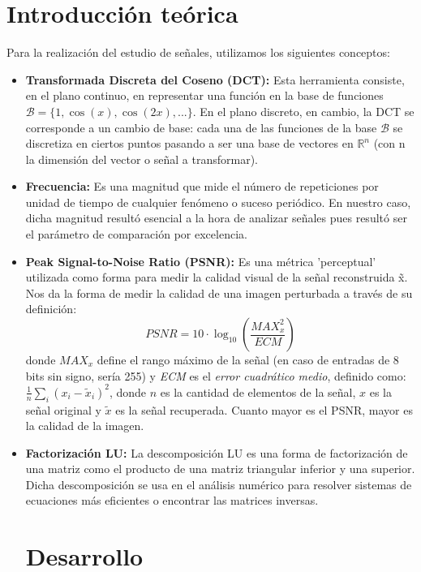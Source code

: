 \documentclass[10pt, a4paper]{article}
\begin{document}
\newpage
\thispagestyle{empty}

\tableofcontents

\newpage

\section{Introducci\'on te\'orica}
Para la realización del estudio de señales, utilizamos los siguientes conceptos:
\begin{itemize}
\item {\textbf{Transformada Discreta del Coseno (DCT):}} Esta herramienta consiste, en el plano continuo, en representar una función en la base de funciones $\mathcal{B}=\{1, \cos(x), \cos(2x),...\}$. En el plano discreto, en cambio, la DCT se corresponde a un cambio de base: cada una de las funciones de la base $\mathcal{B}$ se discretiza en ciertos puntos pasando a ser una base de vectores en $\mathbb{R}^n$ (con n la dimensión del vector o señal a transformar).
\item {\textbf{Frecuencia:}} Es una magnitud que mide el número de repeticiones por unidad de tiempo de cualquier fenómeno o suceso periódico. En nuestro caso, dicha magnitud resultó esencial a la hora de analizar señales pues resultó ser el parámetro de comparación por excelencia.
\item {\textbf{Peak Signal-to-Noise Ratio (PSNR):}} Es una métrica 'perceptual' utilizada como forma para medir la calidad visual de la señal reconstruida \~x. Nos da la forma de medir la calidad de una imagen perturbada a través de su definición:
$$
\mathit{PSNR} = 10 \cdot \log_{10} \left( \frac{\mathit{MAX}^2_x}{\mathit{ECM}} \right)
$$
donde $\mathit{MAX}_x$ define el rango m\'aximo de la se\~nal (en caso de entradas de 8 bits sin signo, ser\'ia 255) y \emph{ECM} es el {\em error cuadr\'atico medio}, definido como:
$ \frac{1}{n} \sum_{i}{(x_{i} - \tilde{x}_{i})^2} $,
donde $n$ es la cantidad de elementos de la se\~nal, $x$ es la se\~nal original y $\tilde{x}$ es la se\~nal recuperada. Cuanto mayor es el PSNR, mayor es la calidad de la imagen.

\item {\textbf{Factorización LU:}} La descomposición LU es una forma de factorización de una matriz como el producto de una matriz triangular inferior y una superior. Dicha descomposición se usa en el análisis numérico para resolver sistemas de ecuaciones más eficientes o encontrar las matrices inversas.

\section{Desarrollo}


\end{itemize}
\end{document}

